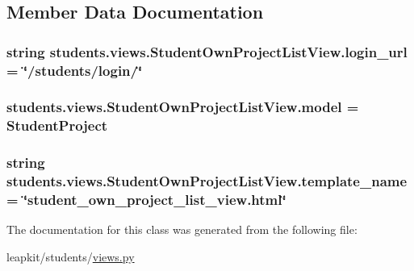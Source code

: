 \subsection{Member Data Documentation}
\hypertarget{classstudents_1_1views_1_1_student_own_project_list_view_ab68e4688743c572f94ce263b0d25f25c}{
\subsubsection[{login\-\_\-url}]{\setlength{\rightskip}{0pt plus 5cm}string students.\-views.\-Student\-Own\-Project\-List\-View.\-login\-\_\-url = \char`\"{}/students/login/\char`\"{}\hspace{0.3cm}{\ttfamily [static]}}}\label{classstudents_1_1views_1_1_student_own_project_list_view_ab68e4688743c572f94ce263b0d25f25c}
\hypertarget{classstudents_1_1views_1_1_student_own_project_list_view_ab24de360971615cba8e75d65a835ceaf}{
\subsubsection[{model}]{\setlength{\rightskip}{0pt plus 5cm}students.\-views.\-Student\-Own\-Project\-List\-View.\-model = Student\-Project\hspace{0.3cm}{\ttfamily [static]}}}\label{classstudents_1_1views_1_1_student_own_project_list_view_ab24de360971615cba8e75d65a835ceaf}
\hypertarget{classstudents_1_1views_1_1_student_own_project_list_view_af9ad46ae5b73ff58b70afb6f463dcd28}{
\subsubsection[{template\-\_\-name}]{\setlength{\rightskip}{0pt plus 5cm}string students.\-views.\-Student\-Own\-Project\-List\-View.\-template\-\_\-name = \char`\"{}student\-\_\-own\-\_\-project\-\_\-list\-\_\-view.\-html\char`\"{}\hspace{0.3cm}{\ttfamily [static]}}}\label{classstudents_1_1views_1_1_student_own_project_list_view_af9ad46ae5b73ff58b70afb6f463dcd28}


The documentation for this class was generated from the following file\-:\begin{DoxyCompactItemize}
\item 
leapkit/students/\hyperlink{views_8py}{views.\-py}\end{DoxyCompactItemize}

